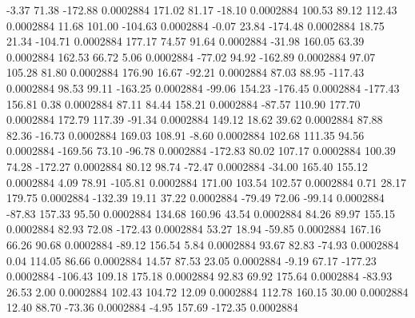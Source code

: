        -3.37       71.38     -172.88     0.0002884
      171.02       81.17      -18.10     0.0002884
      100.53       89.12      112.43     0.0002884
       11.68      101.00     -104.63     0.0002884
       -0.07       23.84     -174.48     0.0002884
       18.75       21.34     -104.71     0.0002884
      177.17       74.57       91.64     0.0002884
      -31.98      160.05       63.39     0.0002884
      162.53       66.72        5.06     0.0002884
      -77.02       94.92     -162.89     0.0002884
       97.07      105.28       81.80     0.0002884
      176.90       16.67      -92.21     0.0002884
       87.03       88.95     -117.43     0.0002884
       98.53       99.11     -163.25     0.0002884
      -99.06      154.23     -176.45     0.0002884
     -177.43      156.81        0.38     0.0002884
       87.11       84.44      158.21     0.0002884
      -87.57      110.90      177.70     0.0002884
      172.79      117.39      -91.34     0.0002884
      149.12       18.62       39.62     0.0002884
       87.88       82.36      -16.73     0.0002884
      169.03      108.91       -8.60     0.0002884
      102.68      111.35       94.56     0.0002884
     -169.56       73.10      -96.78     0.0002884
     -172.83       80.02      107.17     0.0002884
      100.39       74.28     -172.27     0.0002884
       80.12       98.74      -72.47     0.0002884
      -34.00      165.40      155.12     0.0002884
        4.09       78.91     -105.81     0.0002884
      171.00      103.54      102.57     0.0002884
        0.71       28.17      179.75     0.0002884
     -132.39       19.11       37.22     0.0002884
      -79.49       72.06      -99.14     0.0002884
      -87.83      157.33       95.50     0.0002884
      134.68      160.96       43.54     0.0002884
       84.26       89.97      155.15     0.0002884
       82.93       72.08     -172.43     0.0002884
       53.27       18.94      -59.85     0.0002884
      167.16       66.26       90.68     0.0002884
      -89.12      156.54        5.84     0.0002884
       93.67       82.83      -74.93     0.0002884
        0.04      114.05       86.66     0.0002884
       14.57       87.53       23.05     0.0002884
       -9.19       67.17     -177.23     0.0002884
     -106.43      109.18      175.18     0.0002884
       92.83       69.92      175.64     0.0002884
      -83.93       26.53        2.00     0.0002884
      102.43      104.72       12.09     0.0002884
      112.78      160.15       30.00     0.0002884
       12.40       88.70      -73.36     0.0002884
       -4.95      157.69     -172.35     0.0002884
